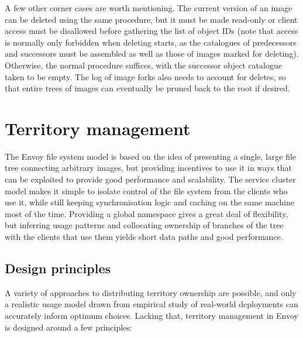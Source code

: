 A few other corner cases are worth mentioning. The current version of an image can be deleted using the same procedure, but it must be made read-only or client access must be disallowed before gathering the list of object IDs (note that access is normally only forbidden when deleting starts, as the catalogues of predecessors and successors must be assembled as well as those of images marked for deleting). Otherwise, the normal procedure suffices, with the successor object catalogue taken to be empty. The log of image forks also needs to account for deletes, so that entire trees of images can eventually be pruned back to the root if desired.

\section{Territory management}\label{sec:territory-management}

The Envoy file system model is based on the idea of presenting a single, large file tree connecting arbitrary images, but providing incentives to use it in ways that can be exploited to provide good performance and scalability. The service cluster model makes it simple to isolate control of the file system from the clients who use it, while still keeping synchronisation logic and caching on the same machine most of the time. Providing a global namespace gives a great deal of flexibility, but inferring usage patterns and collocating ownership of branches of the tree with the clients that use them yields short data paths and good performance.

\subsection{Design principles}

A variety of approaches to distributing territory ownership are possible, and only a realistic usage model drawn from empirical study of real-world deployments can accurately inform optimum choices. Lacking that, territory management in Envoy is designed around a few principles:


